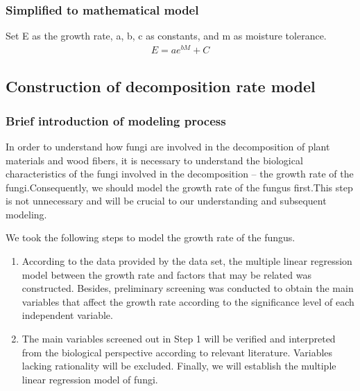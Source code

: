 \documentclass[12pt]{article}
\begin{document}
	
	\subsubsection{Simplified to mathematical model}
	Set E as the growth rate, a, b, c as constants, and m as moisture tolerance.
	\begin{equation}
		\begin{array}{l}
			E=ae^{bM} + C
		\end{array}
	\end{equation}
	
	\subsection{Construction of decomposition rate model}
	\subsubsection{Brief introduction of modeling process}
	In order to understand how fungi are involved in the decomposition of plant materials and wood fibers, it is necessary to understand the biological characteristics of the fungi involved in the decomposition -- the growth rate of the fungi.Consequently, we should model the growth rate of the fungus first.This step is not unnecessary and will be crucial to our understanding and subsequent modeling.\par
	We took the following steps to model the growth rate of the fungus.
	\begin{enumerate}[\bfseries 1.]
		\item According to the data provided by the data set, the multiple linear regression model between the growth rate and factors that may be related was constructed. Besides, preliminary screening was conducted to obtain the main variables that affect the growth rate according to the significance level of each independent variable.
		\item The main variables screened out in Step 1 will be verified and interpreted from the biological perspective according to relevant literature. Variables lacking rationality will be excluded. Finally, we will establish the multiple linear regression model of fungi.
	\end{enumerate}
\end{document}
